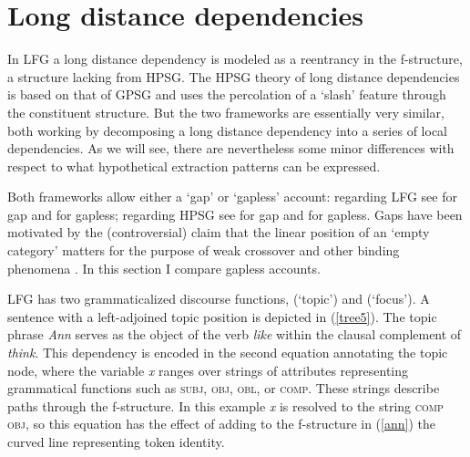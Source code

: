 \section{Long distance dependencies}
In LFG a long distance dependency is modeled as a reentrancy in the f-structure, a structure lacking from HPSG.  The HPSG theory of long distance dependencies is based on that of GPSG and uses the percolation of a `slash' feature through the constituent structure.  But the two frameworks are essentially very similar, both working by decomposing a long distance dependency into a series of local dependencies.  As we will see, there are nevertheless some minor differences with respect to what hypothetical extraction patterns can be expressed.  

Both frameworks allow either a `gap' or `gapless' account:  regarding LFG see \citet{BATW2015a} for gap and \citet{dalrymple;ea19} for gapless; regarding HPSG see \citet{ps2} for gap and \citet{SWB2003a} for gapless.  Gaps have been motivated by the (controversial) claim that the linear position of an `empty category' matters for the purpose of weak crossover and other binding phenomena 
\citep[chapter 9]{BATW2015a}.  In this section I compare gapless accounts.

LFG has two grammaticalized discourse functions,  (`topic') and  (`focus').  A sentence with a left-adjoined topic position is depicted in (\ref{tree5}).  The topic phrase \textit{Ann} serves as the object of the verb \textit{like} within the clausal complement of \textit{think}.  This dependency is encoded in the second equation annotating the topic node, where the variable \textit{x} ranges over strings of attributes representing grammatical functions such as \textsc{subj}, \textsc{obj}, \textsc{obl}, or \textsc{comp}.  These strings describe paths through the f-structure.   In this example \textit{x} is resolved to the string \textsc{comp obj}, so this equation has the effect of adding to the f-structure in (\ref{ann}) the curved line representing token identity.  

